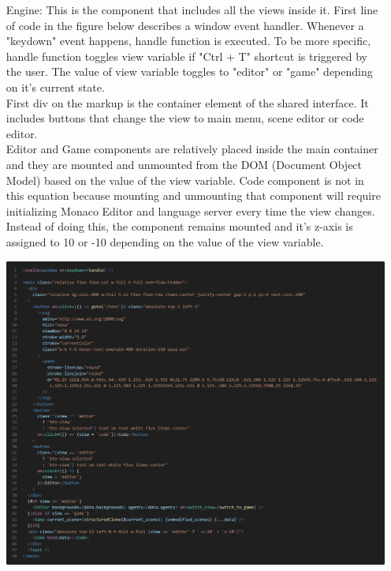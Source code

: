 \documentclass{article}
\begin{document}
\begin{itemize}
\begin{minipage}{\linewidth}
    \end{minipage}\\\\
    \item[Engine:] This is the component that includes all the views inside it. First line of code in the figure below describes a window event handler. Whenever a "keydown" event happens, handle function is executed. To be more specific, handle function toggles view variable if "Ctrl + T" shortcut is triggered by the user. The value of view variable toggles to "editor" or "game" depending on it's current state.\\

    First div on the markup is the container element of the shared interface. It includes buttons that change the view to main menu, scene editor or code editor.\\

    Editor and Game components are relatively placed inside the main container and they are mounted and unmounted from the DOM (Document Object Model) based on the value of the view variable. Code component is not in this equation because mounting and unmounting that component will require initializing Monaco Editor and language server every time the view changes. Instead of doing this, the component remains mounted and it's z-axis is assigned to 10 or -10 depending on the value of the view variable.\\

    \begin{minipage}{\linewidth}
        \centering
        \includegraphics[width=1\textwidth]{engine-code.png}
    \end{minipage}\\\\
    

\end{itemize}
\end{document}
